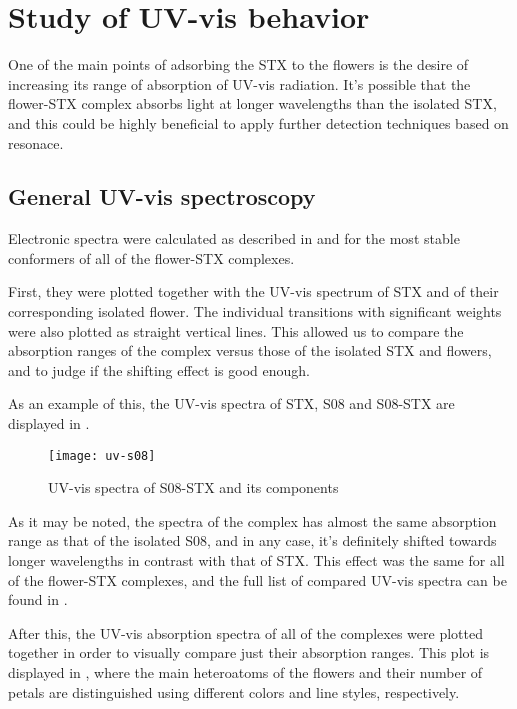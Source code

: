 \section{Study of UV-vis behavior}
One of the main points of adsorbing the STX to the flowers is the desire of increasing its range of absorption of UV-vis radiation.
It's possible that the flower-STX complex absorbs light at longer wavelengths than the isolated STX, and this could be highly beneficial to apply further detection techniques based on resonace.

\subsection{General UV-vis spectroscopy}
Electronic spectra were calculated as described in  and  for the most stable conformers of all of the flower-STX complexes.

First, they were plotted together with the UV-vis spectrum of STX and of their corresponding isolated flower.
The individual transitions with significant weights were also plotted as straight vertical lines.
This allowed us to compare the absorption ranges of the complex versus those of the isolated STX and flowers, and to judge if the shifting effect is good enough.

As an example of this, the UV-vis spectra of STX, S08 and S08-STX are displayed in .

\begin{figure}
    \texttt{[image: uv-s08]}
    \caption[UV-vis spectrum of S08-STX]{UV-vis spectra of S08-STX and its components}
\end{figure}

As it may be noted, the spectra of the complex has almost the same absorption range as that of the isolated S08, and in any case, it's definitely shifted towards longer wavelengths in contrast with that of STX.
This effect was the same for all of the flower-STX complexes, and the full list of compared UV-vis spectra can be found in .

After this, the UV-vis absorption spectra of all of the complexes were plotted together in order to visually compare just their absorption ranges. This plot is displayed in , where the main heteroatoms of the flowers and their number of petals are distinguished using different colors and line styles, respectively.

